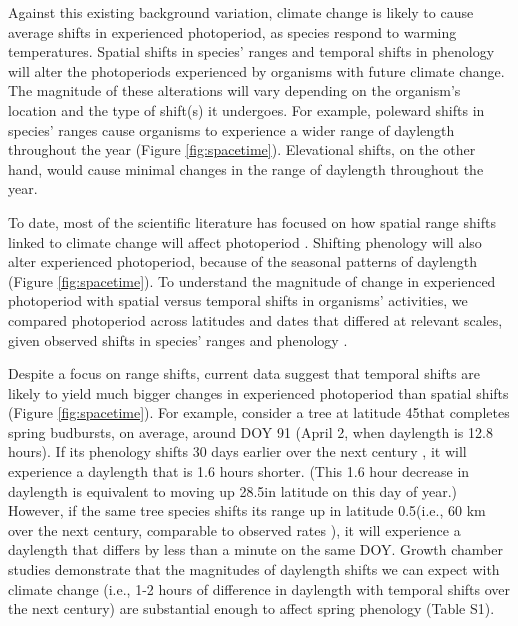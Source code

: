 \documentclass{article}
\begin{document}
\par Against this existing background variation, climate change is likely to cause average shifts in experienced photoperiod, as species respond to warming temperatures. Spatial shifts in species' ranges and temporal shifts in phenology will alter the photoperiods experienced by organisms with future climate change. The magnitude of these alterations will vary depending on the organism's location and the type of shift(s) it undergoes. For example, poleward shifts in species' ranges cause organisms to experience a wider range of daylength throughout the year (Figure \ref{fig:spacetime}). Elevational shifts, on the other hand, would cause minimal changes in the range of daylength throughout the year. %
\par To date, most of the scientific literature has focused on how spatial range shifts linked to climate change will affect photoperiod \citep[e.g.,] []{saikkonen2012, way2015}. Shifting phenology will also alter experienced photoperiod, because of the seasonal patterns of daylength (Figure \ref{fig:spacetime}). To understand the magnitude of change in experienced photoperiod with spatial versus temporal shifts in organisms' activities, we compared photoperiod across latitudes and dates that differed at relevant scales, given observed shifts in species' ranges and phenology \citep{parmesan2003,chen2011}. %
\par Despite a focus on range shifts, current data suggest that temporal shifts are likely to yield much bigger changes in experienced photoperiod than spatial shifts (Figure \ref{fig:spacetime}). For example, consider a tree at latitude 45\degree  that completes spring budbursts, on average, around DOY 91 (April 2, when daylength is 12.8 hours). If its phenology shifts 30 days earlier over the next century \citep[][i.e., a rate of ~3 days per decade, as has been observed]{parmesan2003}, it will experience a daylength that is 1.6 hours shorter. (This 1.6 hour decrease in daylength is equivalent to moving up 28.5\degree  in latitude on this day of year.) However, if the same tree species shifts its range up in latitude 0.5\degree  (i.e., 60 km over the next century,  comparable to observed rates \citep{parmesan2003, chen2011}), it will experience a daylength that differs by less than a minute on the same DOY. Growth chamber studies demonstrate that the magnitudes of daylength shifts we can expect with climate change (i.e., 1-2 hours of difference in daylength with temporal shifts over the next century) are substantial enough to affect spring phenology (Table S1).  
\end{document}
